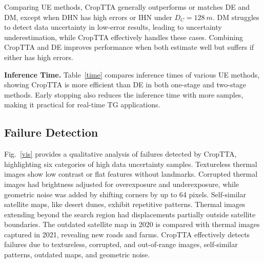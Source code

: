 Comparing UE methods, CropTTA generally outperforms or matches DE and DM, except when DHN has high errors or IHN under $D_C=128~\si{m}$. DM struggles to detect data uncertainty in low-error results, leading to uncertainty underestimation, while CropTTA effectively handles these cases. Combining CropTTA and DE improves performance when both estimate well but suffers if either has high errors.

\textbf{Inference Time.} Table~\ref{time} compares inference times of various UE methods, showing CropTTA is more efficient than DE in both one-stage and two-stage methods. Early stopping also reduces the inference time with more samples, making it practical for real-time TG applications.



\subsection{Failure Detection}\label{sec:robustness}
Fig.~\ref{vis} provides a qualitative analysis of failures detected by CropTTA, highlighting six categories of high data uncertainty samples. Textureless thermal images show low contrast or flat features without landmarks. Corrupted thermal images had brightness adjusted for overexposure and underexposure, while geometric noise was added by shifting corners by up to 64 pixels. Self-similar satellite maps, like desert dunes, exhibit repetitive patterns. Thermal images extending beyond the search region had displacements partially outside satellite boundaries. The outdated satellite map in 2020 is compared with thermal images captured in 2021, revealing new roads and farms. CropTTA effectively detects failures due to textureless, corrupted, and out-of-range images, self-similar patterns, outdated maps, and geometric noise.


